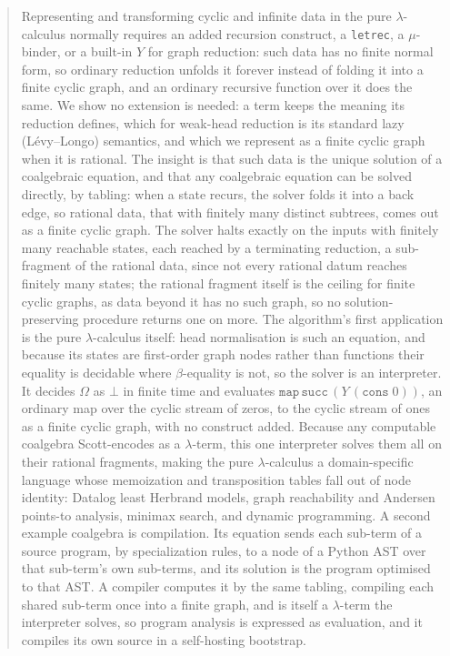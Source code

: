 \begin{abstract}
  Representing and transforming cyclic and infinite data in the pure $\lambda$-calculus normally requires an added recursion construct, a \texttt{letrec}, a $\mu$-binder, or a built-in $Y$ for graph reduction: such data has no finite normal form, so ordinary reduction unfolds it forever instead of folding it into a finite cyclic graph, and an ordinary recursive function over it does the same. We show no extension is needed: a term keeps the meaning its reduction defines, which for weak-head reduction is its standard lazy (L\'evy--Longo) semantics, and which we represent as a finite cyclic graph when it is rational. The insight is that such data is the unique solution of a coalgebraic equation, and that any coalgebraic equation can be solved directly, by tabling: when a state recurs, the solver folds it into a back edge, so rational data, that with finitely many distinct subtrees, comes out as a finite cyclic graph. The solver halts exactly on the inputs with finitely many reachable states, each reached by a terminating reduction, a sub-fragment of the rational data, since not every rational datum reaches finitely many states; the rational fragment itself is the ceiling for finite cyclic graphs, as data beyond it has no such graph, so no solution-preserving procedure returns one on more. The algorithm's first application is the pure $\lambda$-calculus itself: head normalisation is such an equation, and because its states are first-order graph nodes rather than functions their equality is decidable where $\beta$-equality is not, so the solver is an interpreter. It decides $\Omega$ as $\bot$ in finite time and evaluates $\mathtt{map}\,\mathtt{succ}\,(Y\,(\mathtt{cons}\;0))$, an ordinary map over the cyclic stream of zeros, to the cyclic stream of ones as a finite cyclic graph, with no construct added. Because any computable coalgebra Scott-encodes as a $\lambda$-term, this one interpreter solves them all on their rational fragments, making the pure $\lambda$-calculus a domain-specific language whose memoization and transposition tables fall out of node identity: Datalog least Herbrand models, graph reachability and Andersen points-to analysis, minimax search, and dynamic programming. A second example coalgebra is compilation. Its equation sends each sub-term of a source program, by specialization rules, to a node of a Python AST over that sub-term's own sub-terms, and its solution is the program optimised to that AST. A compiler computes it by the same tabling, compiling each shared sub-term once into a finite graph, and is itself a $\lambda$-term the interpreter solves, so program analysis is expressed as evaluation, and it compiles its own source in a self-hosting bootstrap.
\end{abstract}

